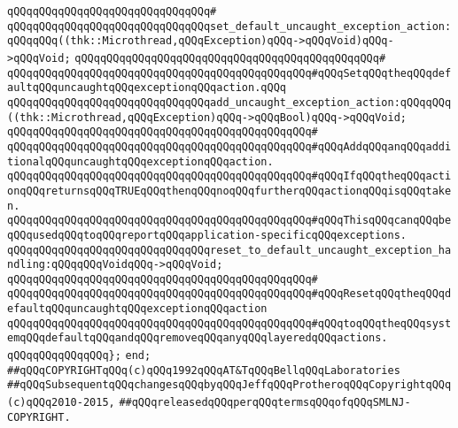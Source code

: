 \verb|qQQqqQQqqQQqqQQqqQQqqQQqqQQqqQQq#|\newline
\verb|qQQqqQQqqQQqqQQqqQQqqQQqqQQqqQQqset_default_uncaught_exception_action:qQQqqQQq((thk::Microthread,qQQqException)qQQq->qQQqVoid)qQQq->qQQqVoid;|\newline
\verb|qQQqqQQqqQQqqQQqqQQqqQQqqQQqqQQqqQQqqQQqqQQqqQQq#|\newline
\verb|qQQqqQQqqQQqqQQqqQQqqQQqqQQqqQQqqQQqqQQqqQQqqQQq#qQQqSetqQQqtheqQQqdefaultqQQquncaughtqQQqexceptionqQQqaction.qQQq|\newline
\newline
\verb|qQQqqQQqqQQqqQQqqQQqqQQqqQQqqQQqadd_uncaught_exception_action:qQQqqQQq((thk::Microthread,qQQqException)qQQq->qQQqBool)qQQq->qQQqVoid;|\newline
\verb|qQQqqQQqqQQqqQQqqQQqqQQqqQQqqQQqqQQqqQQqqQQqqQQq#|\newline
\verb|qQQqqQQqqQQqqQQqqQQqqQQqqQQqqQQqqQQqqQQqqQQqqQQq#qQQqAddqQQqanqQQqadditionalqQQquncaughtqQQqexceptionqQQqaction.|\newline
\verb|qQQqqQQqqQQqqQQqqQQqqQQqqQQqqQQqqQQqqQQqqQQqqQQq#qQQqIfqQQqtheqQQqactionqQQqreturnsqQQqTRUEqQQqthenqQQqnoqQQqfurtherqQQqactionqQQqisqQQqtaken.|\newline
\verb|qQQqqQQqqQQqqQQqqQQqqQQqqQQqqQQqqQQqqQQqqQQqqQQq#qQQqThisqQQqcanqQQqbeqQQqusedqQQqtoqQQqreportqQQqapplication-specificqQQqexceptions.|\newline
\newline
\verb|qQQqqQQqqQQqqQQqqQQqqQQqqQQqqQQqreset_to_default_uncaught_exception_handling:qQQqqQQqVoidqQQq->qQQqVoid;|\newline
\verb|qQQqqQQqqQQqqQQqqQQqqQQqqQQqqQQqqQQqqQQqqQQqqQQq#|\newline
\verb|qQQqqQQqqQQqqQQqqQQqqQQqqQQqqQQqqQQqqQQqqQQqqQQq#qQQqResetqQQqtheqQQqdefaultqQQquncaughtqQQqexceptionqQQqaction|\newline
\verb|qQQqqQQqqQQqqQQqqQQqqQQqqQQqqQQqqQQqqQQqqQQqqQQq#qQQqtoqQQqtheqQQqsystemqQQqdefaultqQQqandqQQqremoveqQQqanyqQQqlayeredqQQqactions.|\newline
\verb|qQQqqQQqqQQqqQQq};|\newline
\verb|end;|\newline
\newline
\newline
\verb|##qQQqCOPYRIGHTqQQq(c)qQQq1992qQQqAT&TqQQqBellqQQqLaboratories|\newline
\verb|##qQQqSubsequentqQQqchangesqQQqbyqQQqJeffqQQqProtheroqQQqCopyrightqQQq(c)qQQq2010-2015,|\newline
\verb|##qQQqreleasedqQQqperqQQqtermsqQQqofqQQqSMLNJ-COPYRIGHT.|\newline

